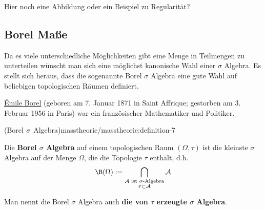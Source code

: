 \documentclass[letterpaper,10pt,english]{jupyterBook}
\begin{document}
\par
Hier noch eine Abbildung oder ein Beispiel zu Regularität?


\subsection{Borel Maße}
\label{\detokenize{masstheorie/masstheorie:borel-masze}}
\par
Da es viele unterschiedliche Möglichkeiten gibt eine Menge in Teilmengen zu unterteilen wünscht man sich eine möglichst kanonische Wahl einer \(\sigma\) Algebra.
Es stellt sich heraus, dass die sogenannte Borel \(\sigma\) Algebra eine gute Wahl auf beliebigen topologischen Räumen definiert.

\begin{emphBox}{}{}

\par
\href{https://de.wikipedia.org/wiki/\%C3\%89mile\_Borel}{Émile Borel} (geboren am 7. Januar 1871 in Saint Affrique; gestorben am 3. Februar 1956 in Paris) war ein französischer Mathematiker und Politiker.
\end{emphBox}
\begin{definition}{(Borel \protect\(\sigma\protect\) Algebra)}{masstheorie/masstheorie:definition-7}



\par
Die \textbf{Borel \(\sigma\) Algebra} auf einem topologischen Raum \((\Omega, \tau)\) ist die kleinste \(\sigma\) Algebra auf der Menge \(\Omega\), die die Topologie \(\tau\) enthält, d.h.
\begin{align*}
\B(\Omega) := \bigcap_{\substack{\mathcal{A} \text{ ist $\sigma$-Algebra}\\ \tau \subset \mathcal{A}}} \mathcal{A}
\end{align*}
\par
Man nennt die Borel \(\sigma\) Algebra auch \textbf{die von \(\tau\) erzeugte \(\sigma\) Algebra}.
\end{definition}
\end{document}
